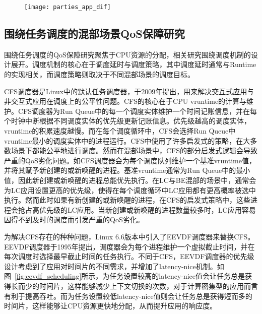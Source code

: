 \begin{figure}[!htbp]
    \centering
    \texttt{[image: parties\_app\_dif]}
    \label{fig:parties_app_dif}
\end{figure}

\subsection{围绕任务调度的混部场景QoS保障研究}


围绕任务调度的QoS保障研究聚焦于CPU资源的分配，相关研究围绕调度机制的设计展开。调度机制的核心在于调度延时与调度策略，其中调度延时通常与Runtime的实现相关，而调度策略则取决于不同混部场景的调度目标。

CFS调度器\citep{pabla2009completely}是Linux中的默认任务调度器，于2009年提出，用来解决交互式应用与非交互式应用在调度上的公平性问题。CFS的核心在于CPU vruntime的计算与维护。CFS调度器为Run Queue中的每一个调度实体维护一个时间记账信息，并在每个时钟中断根据不同调度实体的优先级更新记账信息。优先级越高的调度实体，vruntime的积累速度越慢。而在每个调度循环中，CFS会选择Run Queue中vruntime最小的调度实体中的进程运行。CFS中使用了许多启发式的策略，在大多数场景下都能公平地进行调度。然而在混部场景中，CFS的部分启发式逻辑会导致严重的QoS劣化问题。如CFS调度器会为每个调度队列维护一个基准vruntime值，并将其赋予新创建的或新唤醒的进程。基准vruntime通常为Run Queue中的最小值，因此新创建或新唤醒的进程总能优先执行。在LC与BE混部的场景中，通常会为LC应用设置更高的优先级，使得在每个调度循环中LC应用都有更高概率被选中执行。然而此时如果有新创建的或新唤醒的进程，在CFS的启发式策略中，这些进程会抢占高优先级的LC应用。当新创建或新唤醒的进程数量较多时，LC应用容易因得不到及时的调度而引发严重的QoS劣化。

为解决CFS存在的种种问题，Linux 6.6版本中引入了EEVDF调度器来替换CFS。EEVDF调度器\citep{stoica1995earliest}于1995年提出，调度器会为每个进程维护一个虚拟截止时间，并在每次调度时选择最早截止时间的任务执行。不同于CFS，EEVDF调度器的优先级设计考虑到了应用对时间片的不同需求，并增加了latency-nice机制。如图~\ref{fig:eevdf_scheduling}所示，为任务设置较高的latency-nice值会让任务总是获得长而少的时间片，这样能够减少上下文切换的次数，对于计算密集型的应用而言有利于提高吞吐。而为任务设置较低latency-nice值则会让任务总是获得短而多的时间片，这样能够让CPU资源更快地分配，从而提升应用的响应度。

